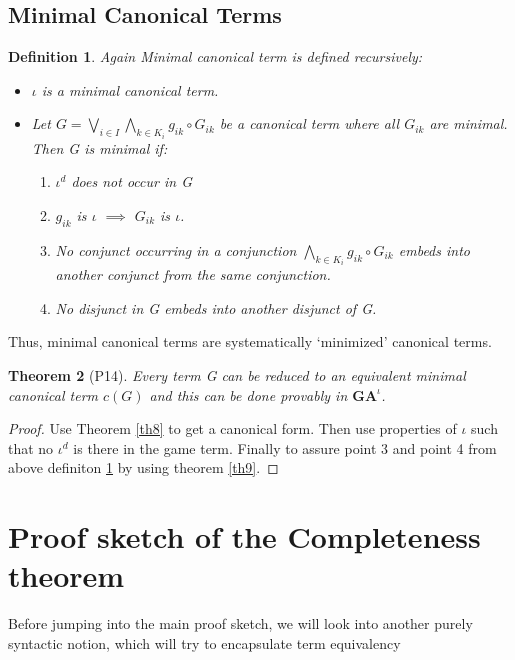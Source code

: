 \documentclass[10pt]{article}
\newcommand{\id}{\iota}
\newtheorem{theorem}{Theorem}
\newtheorem{definition}[theorem]{Definition}
\begin{document}
		\subsection{Minimal Canonical Terms}
		\begin{definition}
			\label{def10}
			Again Minimal canonical term is defined recursively:
			\begin{itemize}
				\item $\id$ is a minimal canonical term.
				\item Let $G = \bigvee_{i\in I}\bigwedge_{k \in K_i} g_{ik}\circ G_{ik}$ be a canonical term where all $G_{ik}$ are minimal. Then G is minimal if:
				\begin{enumerate}
					\item $\id^d$ does not occur in G
					\item $g_{ik}$ is $\id$ $\implies$ $G_{ik}$ is $\id$.
					\item No conjunct occurring in a conjunction $\bigwedge_{k \in K_i}g_{ik} \circ G_{ik}$ embeds into another conjunct from the same conjunction.
					\item No disjunct in G embeds into another disjunct of G.
				\end{enumerate}
			\end{itemize}
		\end{definition}
		Thus, minimal canonical terms are systematically `minimized’ canonical
		terms.
		\begin{theorem}[P14]\label{th13}
			Every term G can be reduced to an equivalent minimal
			canonical term $c(G)$ and this can be done provably in $\textbf{GA}^\id$.
		\end{theorem}
		\begin{proof}
			Use Theorem \ref{th8} to get a canonical form. Then use properties of $\id$ such that no $\id^d$ is there in the game term. Finally to assure point 3 and point 4 from above definiton \ref{def10} by using theorem \ref{th9}.
		\end{proof}
		
		\section{Proof sketch of the Completeness theorem}
		Before jumping into the main proof sketch, we will look into another purely syntactic notion, which will try to encapsulate term equivalency
\end{document}
